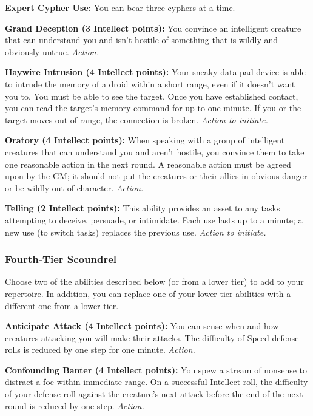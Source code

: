\documentclass[a4paper,10pt,final,twocolumn,oneside]{book}
\newcommand{\itemAbility}[2]{\textcolor{25gray}{\textbullet\textbf{ #1:}}{ #2}\par}
\newcommand{\action}{\textit{ Action.}}
\newcommand{\actionInit}{\textit{ Action to initiate.}}
\begin{document}
\itemAbility{Expert Cypher Use}{You can bear three cyphers at a time.}

\itemAbility{Grand Deception (3 Intellect points)}{You convince an intelligent creature that can understand you and isn’t hostile of something that is wildly and obviously untrue.\action}

\itemAbility{Haywire Intrusion (4 Intellect points)}{ Your sneaky data pad device is able to intrude the memory of a droid within a short range, even if it doesn’t want you to. You must be able to see the target. Once you have established contact, you can read the target’s memory command for up to one minute. If you or the target moves out of range, the connection is broken.\actionInit}

\itemAbility{Oratory (4 Intellect points)}{When speaking with a group of intelligent creatures that can understand you and aren’t hostile, you convince them to take one reasonable action in the next round. A reasonable action must be agreed upon by the GM; it should not put the creatures or their allies in obvious danger or be wildly out of character.\action}

\itemAbility{Telling (2 Intellect points)}{This ability provides an asset to any tasks attempting to deceive, persuade, or intimidate. Each use lasts up to a minute; a new use (to switch tasks) replaces the previous use.\actionInit}


\subsubsection*{Fourth-Tier Scoundrel}
\label{subsub:scoundrelFourthTier}

Choose two of the abilities described below (or from a lower tier) to add to your repertoire. In addition, you can replace one of your lower-tier abilities with a different one from a lower tier.

\itemAbility{Anticipate Attack (4 Intellect points)}{You can sense when and how creatures attacking you will make their attacks. The difficulty of Speed defense rolls is reduced by one step for one minute.\action}

\itemAbility{Confounding Banter (4 Intellect points)}{You spew a stream of nonsense to distract a foe within immediate range. On a successful Intellect roll, the difficulty of your defense roll against the creature’s next attack before the end of the next round is reduced by one step.\action}
\end{document}
